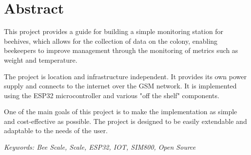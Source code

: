 \section*{Abstract}

This project provides a guide for building a simple monitoring station for beehives, which allows for the collection of data on the colony, enabling beekeepers to improve management through the monitoring of metrics such as weight and temperature.

The project is location and infrastructure independent. It provides its own power supply and connects to the internet over the GSM network. It is implemented using the ESP32 microcontroller and various "off the shelf" components.

One of the main goals of this project is to make the implementation as simple and cost-effective as possible. The project is designed to be easily extendable and adaptable to the needs of the user.

 \emph{Keywords:  Bee Scale, Scale, ESP32, IOT, SIM800, Open Source}